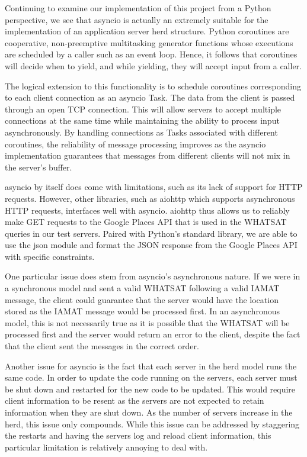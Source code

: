 Continuing to examine our implementation of this project from a Python perspective, we see that asyncio is actually an extremely suitable for the implementation of an application server herd structure. Python coroutines are cooperative, non-preemptive multitasking generator functions whose executions are scheduled by a caller such as an event loop. Hence, it follows that coroutines will decide when to yield, and while yielding, they will accept input from a caller.

The logical extension to this functionality is to schedule coroutines corresponding to each client connection as an asyncio Task. The data from the client is passed through an open TCP connection. This will allow servers to accept multiple connections at the same time while maintaining the ability to process input asynchronously. By handling connections as Tasks associated with different coroutines, the reliability of message processing improves as the asyncio implementation guarantees that messages from different clients will not mix in the server's buffer.

asyncio by itself does come with limitations, such as its lack of support for HTTP requests. However, other libraries, such as aiohttp which supports asynchronous HTTP requests, interfaces well with asyncio. aiohttp thus allows us to reliably make GET requests to the Google Places API that is used in the WHATSAT queries in our test servers. Paired with Python's standard library, we are able to use the json module and format the JSON response from the Google Places API with specific constraints.

One particular issue does stem from asyncio's asynchronous nature. If we were in a synchronous model and sent a valid WHATSAT following a valid IAMAT message, the client could guarantee that the server would have the location stored as the IAMAT message would be processed first. In an asynchronous model, this is not necessarily true as it is possible that the WHATSAT will be processed first and the server would return an error to the client, despite the fact that the client sent the messages in the correct order.

Another issue for asyncio is the fact that each server in the herd model runs the same code. In order to update the code running on the servers, each server must be shut down and restarted for the new code to be updated. This would require client information to be resent as the servers are not expected to retain information when they are shut down. As the number of servers increase in the herd, this issue only compounds. While this issue can be addressed by staggering the restarts and having the servers log and reload client information, this particular limitation is relatively annoying to deal with.

